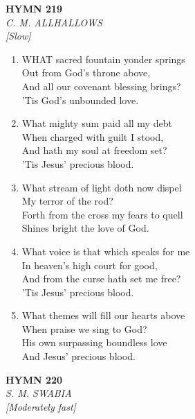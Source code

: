 \documentclass[11pt,a4paper]{article}
\begin{document}
\newpage
\begin{center}
    {\Large \textbf{HYMN 219}}
    \\
    \textit{C. M. ALLHALLOWS}
    \\
    \textit{\small [Slow]}
\end{center}
\vspace{1em}

\begin{enumerate}
    \item WHAT sacred fountain yonder springs \\
            Out from God's throne above, \\
        And all our covenant blessing brings? \\
            'Tis God's unbounded love.

    \item What mighty sum paid all my debt \\
            When charged with guilt I stood, \\
        And hath my soul at freedom set? \\
            'Tis Jesus' precious blood.

    \item What stream of light doth now dispel \\
            My terror of the rod? \\
        Forth from the cross my fears to quell \\
            Shines bright the love of God.

    \item What voice is that which speaks for me \\
            In heaven's high court for good, \\
        And from the curse hath set me free? \\
            'Tis Jesus' precious blood.

    \item What themes will fill our hearts above \\
            When praise we sing to God? \\
        His own surpassing boundless love \\
            And Jesus' precious blood.

\end{enumerate}

\newpage
\begin{center}
    {\Large \textbf{HYMN 220}}
    \\
    \textit{S. M. SWABIA}
    \\
    \textit{\small [Moderately fast]}
\end{center}
\vspace{1em}
\end{document}
